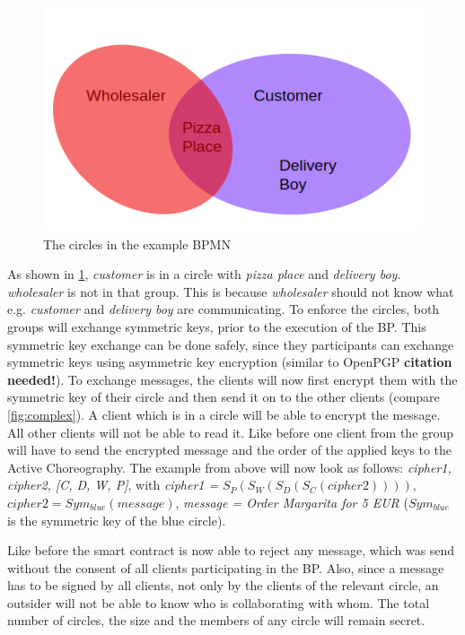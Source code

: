 \documentclass[runningheads]{llncs}
\begin{document}
\begin{figure}
    \centering
    \includegraphics[scale=0.6]{cicles.png}
    \caption{The circles in the example BPMN}
    \label{fig:circle}
\end{figure}


As shown in \ref{fig:circle}, \textit{customer} is in a circle with \textit{pizza place} and \textit{delivery boy}. \textit{wholesaler} is not in that group. This is because \textit{wholesaler} should not know what e.g. \textit{customer} and \textit{delivery boy} are communicating. To enforce the circles, both groups will exchange symmetric keys, prior to the execution of the BP. This symmetric key exchange can be done safely, since they participants can exchange symmetric keys using asymmetric key encryption (similar to OpenPGP  \textbf{citation needed!}). To exchange messages, the clients will now first encrypt them with the symmetric key of their circle and then send it on to the other clients (compare \ref{fig:complex}). A client which is in a circle will be able to encrypt the message. All other clients will not be able to read it. Like before one client from the group will have to send the encrypted message and the order of the applied keys to the Active Choreography. The example from above will now look as follows: \textit{cipher1, cipher2, [C, D, W, P]}, with \textit{cipher1 =} $S_P(S_W(S_D(S_C(cipher2))))$, $cipher2 = Sym_{blue}(message)$, \textit{message = Order Margarita for 5 EUR} ($Sym_{blue}$ is the symmetric key of the blue circle).

Like before the smart contract is now able to reject any message, which was send without the consent of all clients participating in the BP. Also, since a message has to be signed by all clients, not only by the clients of the relevant circle, an outsider will not be able to know who is collaborating with whom. The total number of circles, the size and the members of any circle will remain secret. 
\end{document}
